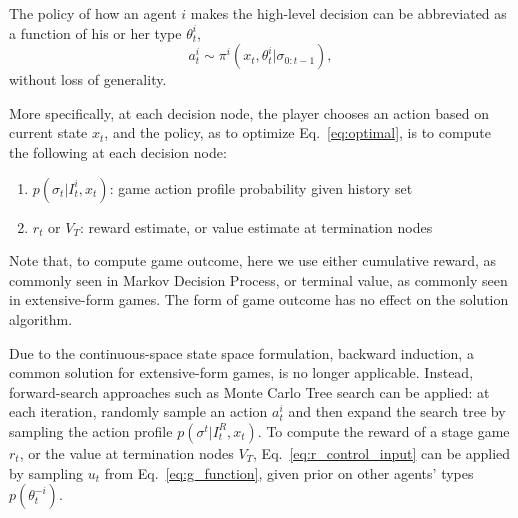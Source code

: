 \documentclass[letterpaper, 10 pt, conference]{ieeeconf}  %
\begin{document}
The policy of how an agent $i$ makes the high-level decision can be 
abbreviated as a function of his or her type $\theta^i_t$,
\begin{equation}
a^i_t \sim \pi^i(x_t,\theta^i_t|\sigma_{0:t-1}),
\end{equation}
without loss of generality.

More specifically, at each decision node, the player chooses an action based on current state $x_t$, and the policy, as to optimize Eq.~\ref{eq:optimal}, is to 
compute the following at each decision node:
\begin{enumerate}
  \item $p(\sigma_{t}|I^i_t,x_t)$: game action profile probability given history set
  \item $r_{t}$ or $V_T$: 
    reward estimate, or value estimate at termination nodes
\end{enumerate}
Note that, to compute game outcome, here we use either cumulative reward, as 
commonly seen in Markov Decision Process, or terminal value, as commonly seen 
in extensive-form games. The form of game outcome has no effect on the 
solution algorithm.  

Due to the continuous-space state space formulation, backward induction, a common 
solution for extensive-form games, is no longer applicable. Instead, 
forward-search approaches such as Monte Carlo Tree search can be applied: at 
each iteration, randomly sample an action $a^i_t$ and then expand the search 
tree by sampling the action profile 
$p(\sigma^t|I^R_t,x_t)$. To 
compute the reward of a stage game $r_t$, or the value at termination nodes $V_T$, Eq.~\ref{eq:r_control_input} can be applied by sampling $u_t$ from 
Eq.~\ref{eq:g_function}, given prior on other agents' types $p(\theta^{-i}_t)$. 

\end{document}
